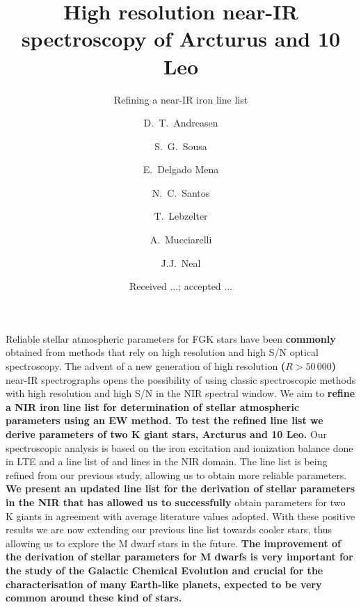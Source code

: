 \documentclass{aa}
\begin{document}
\title{High resolution near-IR spectroscopy of Arcturus and 10 Leo}
\subtitle{Refining a near-IR iron line list}


\author{ D.~T.~Andreasen
    \and S.~G.~Sousa
    \and E.~Delgado Mena
    \and N.~C.~Santos
    \and T.~Lebzelter
    \and A.~Mucciarelli
    \and J.J.~Neal}







\date{Received ...; accepted ...}

\abstract
{Reliable stellar atmospheric parameters for FGK stars have been {\bf commonly} obtained from
methods that rely on high resolution and high S/N optical spectroscopy. The advent of a new
generation of high resolution {\bf ($R>50\,000$)} near-IR spectrographs opens the possibility of
using classic spectroscopic methods with high resolution and high S/N in the NIR spectral window.}
{We aim to {\bf refine a NIR iron line list for determination of stellar atmospheric parameters
using an EW method. To test the refined line list we derive parameters of two K giant stars,
Arcturus and 10 Leo.}}
{Our spectroscopic analysis is based on the iron excitation and ionization balance done in LTE and a
line list of  and  lines in the NIR domain. The line list is being refined
from our previous study, allowing us to obtain more reliable parameters.}
{{\bf We present an updated line list for the derivation of stellar parameters in the NIR that has
allowed us to successfully} obtain parameters for two K giants in agreement with average literature
values adopted.}
{With these positive results we are now extending our previous line list towards cooler stars, thus
allowing us to explore the M dwarf stars in the future. {\bf The improvement of the derivation of
stellar parameters for M dwarfs is very important for the study of the Galactic Chemical Evolution
and crucial for the characterisation of many Earth-like planets, expected to be very common around
these kind of stars.}}
\end{document}
